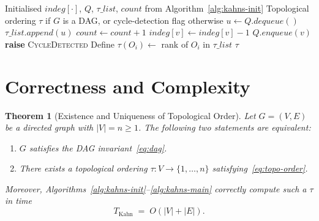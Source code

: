 \documentclass[12pt,openany]{book}
\numberwithin{equation}{chapter}
\theoremstyle{plain}
\newtheorem{theorem}{Theorem}[chapter]
\theoremstyle{definition}
\theoremstyle{remark}
\numberwithin{equation}{chapter}
\theoremstyle{plain}
\begin{document}
\begin{algorithm}[H]
\caption{Kahn's Topological Sort --- Main Loop and Output}
\label{alg:kahns-main}
\begin{algorithmic}[1]
  \Require Initialised $\mathit{indeg}[\cdot]$, $Q$,
           $\tau\_list$, $\mathit{count}$ from
           Algorithm~\ref{alg:kahns-init}
  \Ensure Topological ordering $\tau$ if $G$ is a DAG,
          or cycle-detection flag otherwise
    \State $u \leftarrow Q.\mathit{dequeue}()$
    \State $\tau\_list.\mathit{append}(u)$
    \State $\mathit{count} \leftarrow \mathit{count} + 1$
      \State $\mathit{indeg}[v] \leftarrow \mathit{indeg}[v] - 1$
        \State $Q.\mathit{enqueue}(v)$
      \EndIf
    \EndFor
  \EndWhile
    \State \textbf{raise} \textsc{CycleDetected}
  \Else
    \State Define $\tau(O_i) \leftarrow$ rank of $O_i$ in
           $\tau\_list$
    \State \Return $\tau$
  \EndIf
\end{algorithmic}
\end{algorithm}

\section{Correctness and Complexity}
\label{sec:dag-correctness}

\begin{theorem}[Existence and Uniqueness of Topological Order]
\label{thm:topo-exists}
Let $G = (V, E)$ be a directed graph with $|V| = n \geq 1$.
The following two statements are equivalent:
\begin{enumerate}
  \item $G$ satisfies the DAG invariant~\eqref{eq:dag}.
  \item There exists a topological ordering
        $\tau : V \to \{1, \ldots, n\}$
        satisfying~\eqref{eq:topo-order}.
\end{enumerate}
Moreover, Algorithms~\ref{alg:kahns-init}--\ref{alg:kahns-main}
correctly compute such a $\tau$ in time
\begin{equation}
  T_{\mathrm{Kahn}} \;=\; O(|V| + |E|).
  \label{eq:kahn-complexity}
\end{equation}
\end{theorem}
\end{document}
